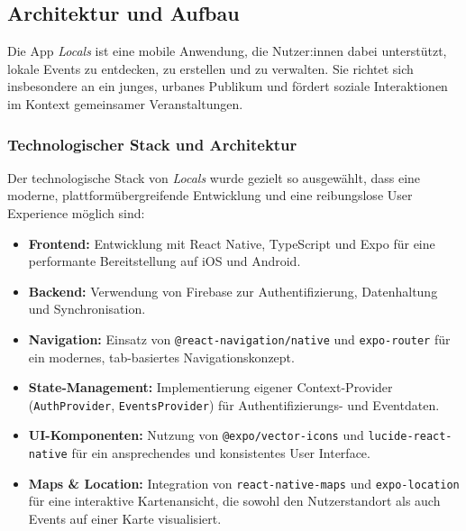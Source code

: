 \subsection{Architektur und Aufbau}

Die App \textit{Locals} ist eine mobile Anwendung, die Nutzer:innen dabei
unterstützt, lokale Events zu entdecken, zu erstellen und zu verwalten. Sie
richtet sich insbesondere an ein junges, urbanes Publikum und fördert soziale
Interaktionen im Kontext gemeinsamer Veranstaltungen.


\subsubsection{Technologischer Stack und Architektur}

Der technologische Stack von \textit{Locals} wurde gezielt so ausgewählt, dass
eine moderne, plattformübergreifende Entwicklung und eine reibungslose User
Experience möglich sind:
\begin{itemize}
    \item \textbf{Frontend:} Entwicklung mit React Native, TypeScript und Expo für eine performante Bereitstellung auf iOS und Android.
    \item \textbf{Backend:} Verwendung von Firebase zur Authentifizierung, Datenhaltung und Synchronisation.
    \item \textbf{Navigation:} Einsatz von \texttt{@react-navigation/native} und \texttt{expo-router} für ein modernes, tab-basiertes Navigationskonzept.
    \item \textbf{State-Management:} Implementierung eigener Context-Provider (\texttt{AuthProvider}, \texttt{EventsProvider}) für Authentifizierungs- und Eventdaten.
    \item \textbf{UI-Komponenten:} Nutzung von \texttt{@expo/vector-icons} und \texttt{lucide-react-native} für ein ansprechendes und konsistentes User Interface.
    \item \textbf{Maps \& Location:} Integration von \texttt{react-native-maps} und \texttt{expo-location} für eine interaktive Kartenansicht, die sowohl den Nutzerstandort als auch Events auf einer Karte visualisiert.
\end{itemize}


